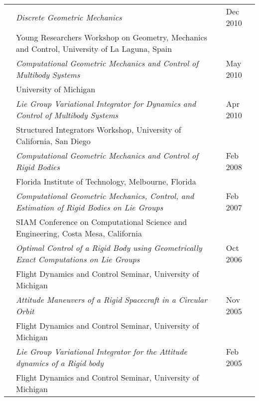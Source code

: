 \documentclass[10pt]{article}
\begin{document}
\begin{tabularx}{\textwidth}{>{\setlength{\hsize}{0.5cm}}X%
>{\setlength{\hsize}{14.3cm}}X%
>{\hfill}X}
& \textit{Discrete Geometric Mechanics} & Dec 2010\\
& {Young Researchers Workshop on Geometry, Mechanics and Control}, University of La Laguna, Spain\vspace*{0.08cm}\\
& \textit{Computational Geometric Mechanics and Control of Multibody Systems} & May 2010\\
& {University of Michigan}\vspace*{0.08cm}\\
& \textit{Lie Group Variational Integrator for Dynamics and Control of Multibody Systems} & Apr 2010\\
& {Structured Integrators Workshop}, University of California, San Diego\vspace*{0.08cm}\\
& \textit{Computational Geometric Mechanics and Control of Rigid Bodies} & Feb 2008\\
& {Florida Institute of Technology}, Melbourne, Florida\vspace*{0.08cm}\\
& \textit{Computational Geometric Mechanics, Control, and Estimation of Rigid Bodies on Lie Groups} & Feb 2007\\
& {SIAM Conference on Computational Science and Engineering}, Costa Mesa, California\vspace*{0.08cm}\\
& \textit{Optimal Control of a Rigid Body using Geometrically Exact Computations on Lie Groups} & Oct 2006\\
& {Flight Dynamics and Control Seminar}, University of Michigan\vspace*{0.08cm}\\
& \textit{Attitude Maneuvers of a Rigid Spacecraft in a Circular Orbit} & Nov 2005\\
& {Flight Dynamics and Control Seminar}, University of Michigan\vspace*{0.08cm}\\
& \textit{Lie Group Variational Integrator for the Attitude dynamics of a Rigid body} & Feb 2005\\
& {Flight Dynamics and Control Seminar}, University of Michigan
\end{tabularx}


\vspace*{0.2cm}

\newcommand{\bfi}[1]{\textbf{\textit{#1}}}
\end{document}
